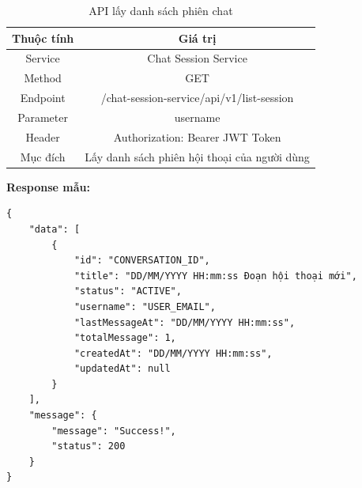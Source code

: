 \documentclass[../DoAn.tex]{subfiles}
\begin{document}
\begin{table}[H]
    \centering
    \renewcommand{\arraystretch}{1.8}
    \begin{tabular}{|c|c|}
        \hline
        \textbf{Thuộc tính} & \textbf{Giá trị}                             \\
        \hline
        Service             & Chat Session Service                         \\
        \hline
        Method              & GET                                          \\
        \hline
        Endpoint            & /chat-session-service/api/v1/list-session    \\
        \hline
        Parameter           & username                                     \\
        \hline
        Header              & Authorization: Bearer JWT Token              \\
        \hline
        Mục đích            & Lấy danh sách phiên hội thoại của người dùng \\
        \hline
    \end{tabular}
    \caption{API lấy danh sách phiên chat}
\end{table}


\textbf{Response mẫu:}
\begin{verbatim}
{
    "data": [
        {
            "id": "CONVERSATION_ID",
            "title": "DD/MM/YYYY HH:mm:ss Đoạn hội thoại mới",
            "status": "ACTIVE",
            "username": "USER_EMAIL",
            "lastMessageAt": "DD/MM/YYYY HH:mm:ss",
            "totalMessage": 1,
            "createdAt": "DD/MM/YYYY HH:mm:ss",
            "updatedAt": null
        }
    ],
    "message": {
        "message": "Success!",
        "status": 200
    }
}
\end{verbatim}
\clearpage
\end{document}
